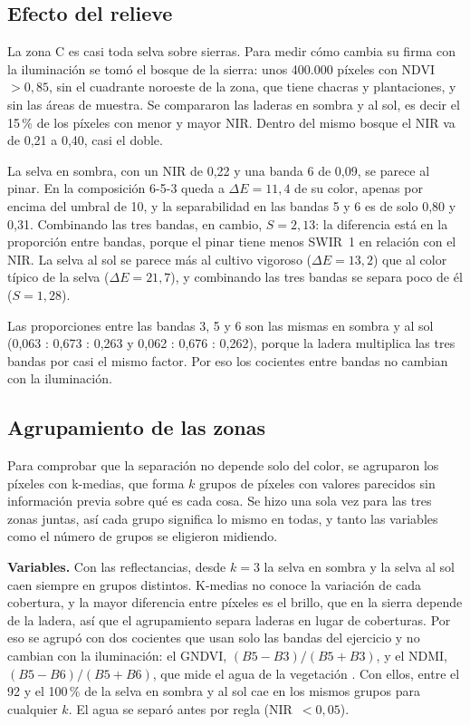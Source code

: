     \subsection{Efecto del relieve}

        La zona C es casi toda selva sobre sierras. Para medir cómo cambia su firma con la iluminación se tomó el bosque de la sierra: unos 400.000 píxeles con NDVI~$> 0{,}85$, sin el cuadrante noroeste de la zona, que tiene chacras y plantaciones, y sin las áreas de muestra. Se compararon las laderas en sombra y al sol, es decir el 15\,\% de los píxeles con menor y mayor NIR. Dentro del mismo bosque el NIR va de 0,21 a 0,40, casi el doble.

        La selva en sombra, con un NIR de 0,22 y una banda 6 de 0,09, se parece al pinar. En la composición 6-5-3 queda a $\Delta E = 11{,}4$ de su color, apenas por encima del umbral de 10, y la separabilidad en las bandas 5 y 6 es de solo 0,80 y 0,31. Combinando las tres bandas, en cambio, $S = 2{,}13$: la diferencia está en la proporción entre bandas, porque el pinar tiene menos SWIR~1 en relación con el NIR. La selva al sol se parece más al cultivo vigoroso ($\Delta E = 13{,}2$) que al color típico de la selva ($\Delta E = 21{,}7$), y combinando las tres bandas se separa poco de él ($S = 1{,}28$).

        Las proporciones entre las bandas 3, 5 y 6 son las mismas en sombra y al sol (0,063 : 0,673 : 0,263 y 0,062 : 0,676 : 0,262), porque la ladera multiplica las tres bandas por casi el mismo factor. Por eso los cocientes entre bandas no cambian con la iluminación.

    \subsection{Agrupamiento de las zonas}

        Para comprobar que la separación no depende solo del color, se agruparon los píxeles con k-medias, que forma $k$ grupos de píxeles con valores parecidos sin información previa sobre qué es cada cosa. Se hizo una sola vez para las tres zonas juntas, así cada grupo significa lo mismo en todas, y tanto las variables como el número de grupos se eligieron midiendo.

        \textbf{Variables.} Con las reflectancias, desde $k = 3$ la selva en sombra y la selva al sol caen siempre en grupos distintos. K-medias no conoce la variación de cada cobertura, y la mayor diferencia entre píxeles es el brillo, que en la sierra depende de la ladera, así que el agrupamiento separa laderas en lugar de coberturas. Por eso se agrupó con dos cocientes que usan solo las bandas del ejercicio y no cambian con la iluminación: el GNDVI, $(B5-B3)/(B5+B3)$, y el NDMI, $(B5-B6)/(B5+B6)$, que mide el agua de la vegetación \cite{ej3_gao}. Con ellos, entre el 92 y el 100\,\% de la selva en sombra y al sol cae en los mismos grupos para cualquier $k$. El agua se separó antes por regla (NIR~$< 0{,}05$).

